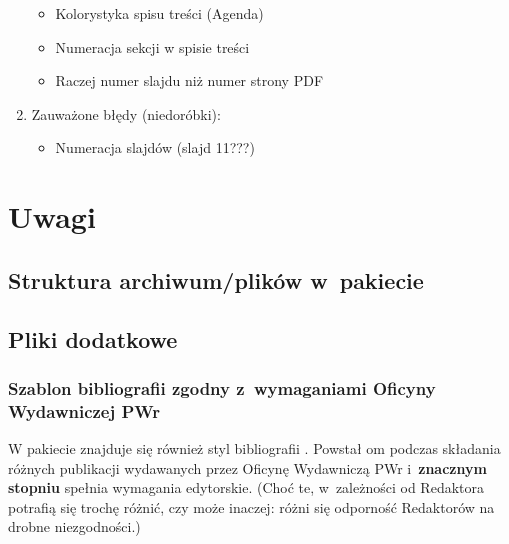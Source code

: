 \begin{frame}
\begin{enumerate}
        \begin{itemize}
         \item[\emptybox] Kolorystyka spisu treści (Agenda)
         \item[\done] Numeracja sekcji w spisie treści
          \item[\done] Raczej numer slajdu niż numer strony PDF
        \end{itemize}
  \item Zauważone błędy (niedoróbki):
        \begin{itemize}
         \item[\done]
               Numeracja slajdów (slajd 11???)
        \end{itemize}
 \end{enumerate}
\end{frame}

%

\section{Uwagi}

\subsection{Struktura archiwum/plików w~pakiecie}

{
 \footnotesize
 
}

\subsection{Pliki dodatkowe}

\subsubsection{Szablon bibliografii zgodny z~wymaganiami Oficyny Wydawniczej PWr}

W pakiecie znajduje się również styl bibliografii . Powstał om podczas składania różnych publikacji wydawanych przez Oficynę Wydawniczą PWr i~\textbf{znacznym stopniu} spełnia wymagania edytorskie. (Choć te, w~zależności od Redaktora potrafią się trochę różnić, czy może inaczej: różni się odporność Redaktorów na drobne niezgodności.)


